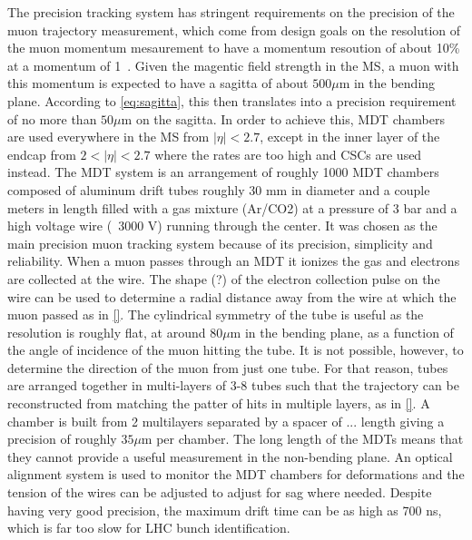 The precision tracking system has stringent requirements
on the precision of the muon trajectory measurement, 
which come from design goals on the resolution of the muon
momentum mesaurement to have a momentum resoution of 
about 10\% at a momentum of 1~\TeV.
Given the magentic field strength in the MS, a muon 
with this momentum is expected to have a sagitta
of about $500\mu$m in the bending plane. 
According to \eqn\eqref{eq:sagitta},
this then translates into a precision requirement of 
no more than $50 \mu$m on the sagitta.
In order to achieve this, MDT chambers are used everywhere 
in the MS from $|\eta|<2.7$, except in the inner layer of the 
endcap from $2<|\eta|<2.7$
where the rates are too high 
and CSCs
are used instead. 
The MDT system is an arrangement of roughly 1000 MDT chambers composed
of aluminum drift tubes roughly 30 mm in diameter and a couple meters in length 
filled with a gas mixture
(Ar/CO2) at a pressure of 3 bar and a high voltage wire (~3000 V)
running through the center. 
It was chosen as the main precision muon tracking system
because of its precision, simplicity and reliability.
When a muon passes through an MDT
it ionizes the gas and electrons are collected at the wire.
The shape (?) of the electron collection pulse on the wire
can be used to determine a radial distance away from the wire
at which the muon passed as in \fig\ref{}. The cylindrical symmetry
of the tube is useful as the resolution is roughly flat, at around
$80\mu$m in the bending plane, as a function
of the angle of incidence of the muon hitting the tube. 
It is not possible, however, to determine the direction
of the muon from just one tube.  For that reason, 
tubes are arranged together in multi-layers of 3-8 tubes such that 
the trajectory
can be reconstructed from matching the patter of hits in multiple layers,
as in \fig\ref{}.
A chamber is built from 2 multilayers separated by a spacer of ... length
giving a precision of roughly $35 \mu$m per chamber.
The long length of the MDTs means that they cannot provide a  useful measurement
in the non-bending plane.
An optical alignment system is used to monitor the MDT chambers %
for deformations and the tension of the wires can be adjusted
to adjust for sag where needed. %
Despite having very good precision, the maximum drift time
can be as high as 700 ns, which is far too slow for LHC bunch identification.



